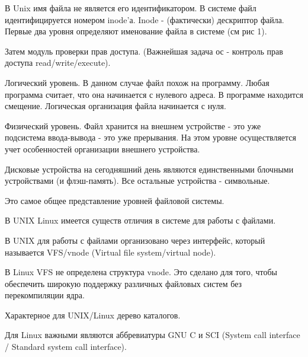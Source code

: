 В Unix имя файла не является его идентификатором. В системе файл идентифицируется номером inode'а. Inode - (фактически) дескриптор файла. Первые два уровня определяют именование файла в системе (см рис 1).

Затем модуль проверки прав доступа. (Важнейшая задача ос - контроль прав доступа read/write/execute).

Логический уровень. В данном случае файл похож на программу. Любая программа считает, что она начинается с нулевого адреса. В программе находится смещение. Логическая организация файла начинается с нуля.

Физический уровень. Файл хранится на внешнем устройстве - это уже подсистема ввода-вывода - это уже прерывания. На этом уровне осуществляется учет особенностей организации внешнего устройства.

Дисковые устройства на сегодняшний день являются единственными блочными устройствами (и флэш-память). Все остальные устройства - символьные.

Это самое общее представление уровней файловой системы.

В UNIX Linux имеется существ отличия в системе для работы с файлами.

В UNIX для работы с файлами организовано через интерфейс, который называется VFS/vnode (Virtual file system/virtual node).

В Linux VFS не определена структура vnode. Это сделано для того, чтобы обеспечить широкую поддержку различных файловых систем без перекомпиляции ядра.

\begin{figure}[H]
	\center{\texttt{[image: -2]}}
\end{figure}


\begin{figure}[H]
	\center{\texttt{[image: -3]}}
\end{figure}

Характерное для UNIX/Linux дерево каталогов.


\begin{figure}[H]
	\center{\texttt{[image: -4]}}
\end{figure}

Для Linux важными являются аббревиатуры GNU C и SCI (System call interface / Standard system call interface).


\begin{figure}[H]
	\center{\texttt{[image: -5]}}
\end{figure}

